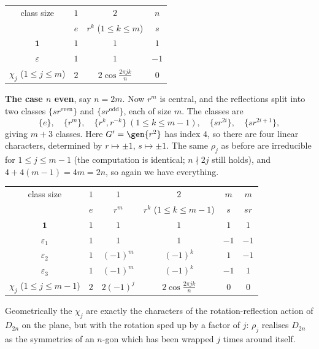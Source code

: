 \begin{center}
\renewcommand{\arraystretch}{1.35}
\setlength{\tabcolsep}{11pt}
\begin{tabular}{c|ccc}
\toprule
class size & $1$ & $2$ & $n$\\
 & $e$ & $r^k$ \; ($1\leq k\leq m$) & $s$\\
\midrule
$\mathbf 1$ & $1$ & $1$ & $1$\\
$\varepsilon$ & $1$ & $1$ & $-1$\\
$\chi_j$ \; ($1\leq j\leq m$) & $2$ & $2\cos\frac{2\pi jk}{n}$ & $0$\\
\bottomrule
\end{tabular}
\end{center}

\textbf{The case $n$ even}, say $n = 2m$. Now $r^m$ is central, and the reflections split into two classes $\{sr^{\text{even}}\}$ and $\{sr^{\text{odd}}\}$, each of size $m$. The classes are
$$\{e\},\quad \{r^m\},\quad \{r^k,r^{-k}\}\ (1\leq k\leq m-1),\quad \{sr^{2i}\},\quad\{sr^{2i+1}\},$$
giving $m+3$ classes. Here $G' = \gen{r^2}$ has index $4$, so there are four linear characters, determined by $r\mapsto\pm1$, $s\mapsto\pm1$. The same $\rho_j$ as before are irreducible for $1\leq j \leq m-1$ (the computation is identical; $n\nmid 2j$ still holds), and $4 + 4(m-1) = 4m = 2n$, so again we have everything.

\begin{center}
\renewcommand{\arraystretch}{1.35}
\setlength{\tabcolsep}{9pt}
\begin{tabular}{c|ccccc}
\toprule
class size & $1$ & $1$ & $2$ & $m$ & $m$\\
 & $e$ & $r^m$ & $r^k$ \; ($1\leq k \leq m-1$) & $s$ & $sr$\\
\midrule
$\mathbf 1$ & $1$ & $1$ & $1$ & $1$ & $1$\\
$\varepsilon_1$ & $1$ & $1$ & $1$ & $-1$ & $-1$\\
$\varepsilon_2$ & $1$ & $(-1)^m$ & $(-1)^k$ & $1$ & $-1$\\
$\varepsilon_3$ & $1$ & $(-1)^m$ & $(-1)^k$ & $-1$ & $1$\\
$\chi_j$ \; ($1\leq j\leq m-1$) & $2$ & $2(-1)^j$ & $2\cos\frac{2\pi jk}{n}$ & $0$ & $0$\\
\bottomrule
\end{tabular}
\end{center}

Geometrically the $\chi_j$ are exactly the characters of the rotation-reflection action of $D_{2n}$ on the plane, but with the rotation sped up by a factor of $j$: $\rho_j$ realises $D_{2n}$ as the symmetries of an $n$-gon which has been wrapped $j$ times around itself.

